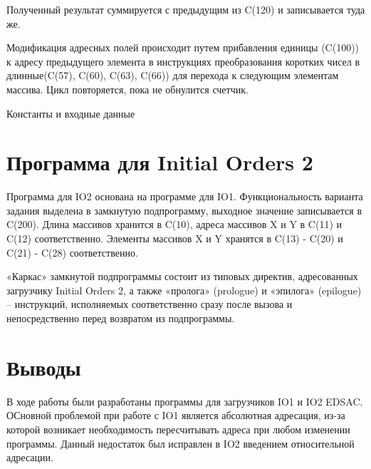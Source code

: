 Полученный результат суммируется с предыдущим из C(120) и записывается туда же.


\parindent=1cm

Модификация адресных полей происходит путем прибавления единицы (C(100)) к адресу предыдущего элемента в инструкциях преобразования коротких чисел в длинные(C(57), C(60), C(63), C(66)) для перехода к следующим элементам массива. Цикл повторяется, пока не обнулится счетчик.


\parindent=1cm

Константы и входные данные


\parindent=1cm

\section{Программа для Initial Orders 2}
Программа для IO2 основана на программе для IO1. Функциональность варианта задания выделена в замкнутую подпрограмму, выходное значение записывается в C(200). Длина массивов хранится в C(10), адреса массивов X и Y в C(11) и C(12) соответственно. Элементы массивов X и Y хранятся в C(13) - C(20) и C(21) - C(28) соответственно.

«Каркас» замкнутой подпрограммы состоит из типовых директив, адресованных загрузчику Initial Orders 2, а также «пролога» (prologue) и «эпилога» (epilogue) – инструкций, исполняемых соответственно сразу после вызова и непосредственно перед возвратом из подпрограммы.


\parindent=1cm %


\section{Выводы}
В ходе работы были разработаны программы для загрузчиков IO1 и IO2 EDSAC. ОСновной проблемой при работе с IO1 является абсолютная адресация, из-за которой возникает необходимость пересчитывать адреса при любом изменении программы. Данный недостаток был исправлен в IO2 введением относительной адресации.

